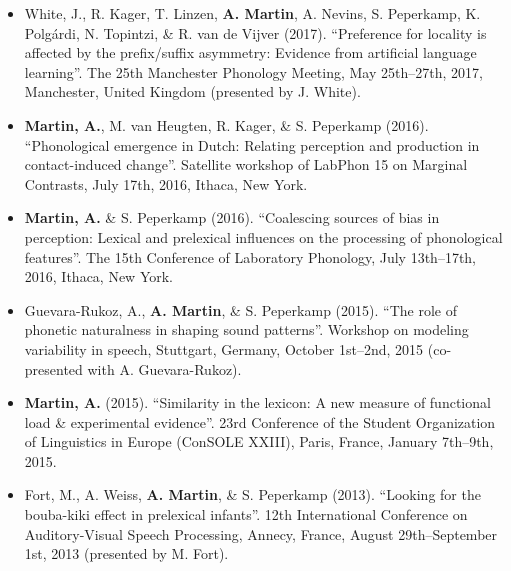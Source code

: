 \documentclass[a4paper, 10pt]{article}
\begin{document}
\begin{itemize}
\RaggedRight


\item White, J., R. Kager, T. Linzen, \textbf{A. Martin}, A. Nevins,
  S. Peperkamp, K. Polgárdi, N. Topintzi, \&  R. van de Vijver
  (2017). \enquote{Preference for locality is affected by the
    prefix/suffix asymmetry: Evidence from artificial language
    learning}.  The 25th Manchester Phonology Meeting, May 25th--27th,
  2017, Manchester, United Kingdom (presented by J. White).

\item \textbf{Martin, A.}, M. van Heugten, R. Kager, \& S. Peperkamp
  (2016). \enquote{Phonological emergence in Dutch: Relating
    perception and production in contact-induced change}. Satellite
  workshop of LabPhon 15 on Marginal Contrasts, July 17th, 2016,
  Ithaca, New York.

\item \textbf{Martin, A.} \& S. Peperkamp (2016).  \enquote{Coalescing sources of bias in perception:
    Lexical and prelexical influences on the processing of phonological
    features}. The 15th Conference of
  Laboratory Phonology, July 13th--17th, 2016, Ithaca, New York.

\item Guevara-Rukoz, A., \textbf{A. Martin}, \& S. Peperkamp
  (2015). \enquote{The role of phonetic naturalness in shaping sound
    patterns}. Workshop on modeling variability in speech, Stuttgart,
  Germany, October 1st--2nd, 2015 (co-presented with
  A. Guevara-Rukoz).

\item \textbf{Martin, A.} (2015). \enquote{Similarity in the lexicon: A new measure of functional load \& experimental evidence}.  23rd
  Conference of the Student Organization of Linguistics in Europe
  (ConSOLE XXIII), Paris, France, January 7th--9th, 2015.

\item Fort, M., A. Weiss, \textbf{A. Martin}, \& S. Peperkamp (2013). \enquote{Looking
  for the bouba-kiki effect in prelexical infants}. 12th International
  Conference on Auditory-Visual Speech Processing, Annecy, France,
  August 29th--September 1st, 2013 (presented by M. Fort).

\end{itemize}
\end{document}
